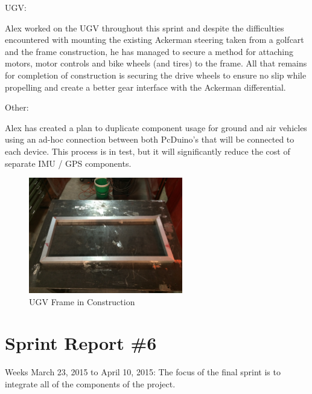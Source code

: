 \begin{enumerate}
UGV:

Alex worked on the UGV throughout this sprint and despite the difficulties encountered with mounting the existing Ackerman steering taken from a golfcart and the frame construction, he has managed to secure a method for attaching motors, motor controls and bike wheels (and tires) to the frame.  All that remains for completion of construction is securing the drive wheels to ensure no slip while propelling and create a better gear interface with the Ackerman differential.

Other:

Alex has created a plan to duplicate component usage for ground and air vehicles using an ad-hoc connection between both PcDuino’s that will be connected to each device.  This process is in test, but it will significantly reduce the cost of separate IMU / GPS components.


\begin{figure}[tbh]
\begin{center}
\includegraphics[width=0.6\textwidth]{resources/img/Frame}
\end{center}
\caption{UGV Frame in Construction \label{systemdiagram}}
\end{figure}

\end{enumerate}



\section{Sprint Report \#6}
Weeks March 23, 2015 to April 10, 2015:
The focus of the final sprint is to integrate all of the components of the project.

